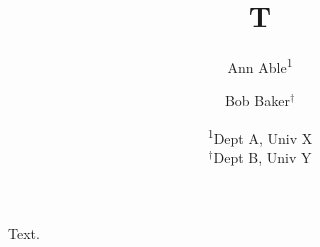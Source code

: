 \documentclass{article}
\author{Ann Able\textsuperscript{1} \and Bob Baker$^\dag$}
\title{T}
\date{\small \textsuperscript{1}Dept A, Univ X\\ $^\dag$Dept B, Univ Y}
\begin{document}
\maketitle
Text.
\end{document}
